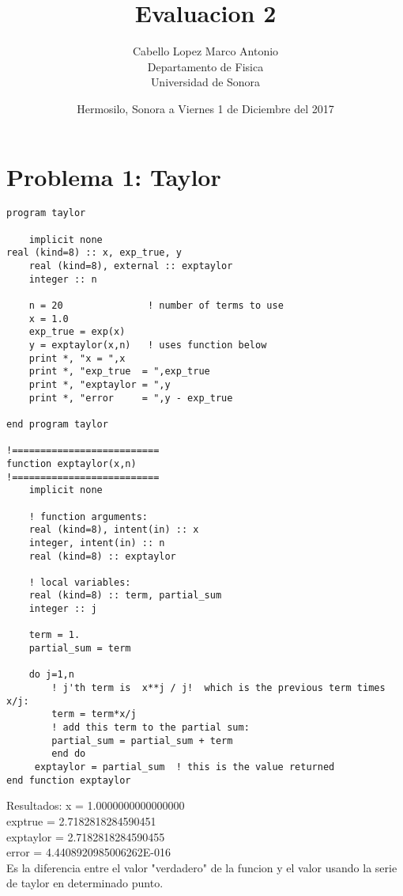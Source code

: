 \documentclass{article}
\title{Evaluacion 2}
\author{Cabello Lopez Marco Antonio\\
Departamento de Fisica \\
Universidad de Sonora}
\date{Hermosilo, Sonora a Viernes 1 de Diciembre del 2017}
\begin{document}
\maketitle
\clearpage

\section{Problema 1: Taylor}
\begin{verbatim}
program taylor

    implicit none                  
real (kind=8) :: x, exp_true, y
    real (kind=8), external :: exptaylor
    integer :: n

    n = 20               ! number of terms to use
    x = 1.0
    exp_true = exp(x)
    y = exptaylor(x,n)   ! uses function below
    print *, "x = ",x
    print *, "exp_true  = ",exp_true
    print *, "exptaylor = ",y
    print *, "error     = ",y - exp_true

end program taylor

!==========================
function exptaylor(x,n)
!==========================
    implicit none

    ! function arguments:
    real (kind=8), intent(in) :: x
    integer, intent(in) :: n
    real (kind=8) :: exptaylor

    ! local variables:
    real (kind=8) :: term, partial_sum
    integer :: j

    term = 1.
    partial_sum = term

    do j=1,n
        ! j'th term is  x**j / j!  which is the previous term times x/j:
        term = term*x/j   
        ! add this term to the partial sum:
        partial_sum = partial_sum + term   
        end do
     exptaylor = partial_sum  ! this is the value returned
end function exptaylor
\end{verbatim}
Resultados:  x =    1.0000000000000000    \\
exptrue  =    2.7182818284590451 \\
exptaylor =    2.7182818284590455    \\
error     =    4.4408920985006262E-016 \\
Es la diferencia entre el valor "verdadero" de la funcion y el valor usando la serie de taylor en determinado punto.
\clearpage
\end{document}
